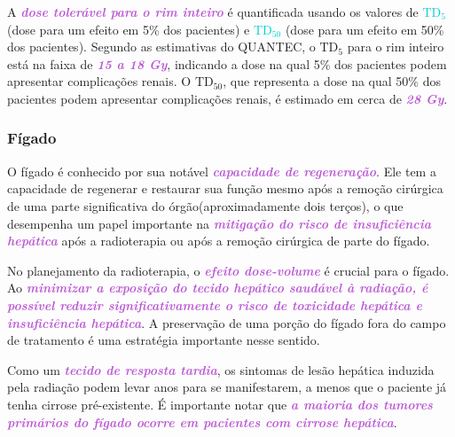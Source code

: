 \documentclass[11pt,a4paper]{article}
\begin{document}
	A \textcolor{MediumOrchid}{\textbf{\textit{dose tolerável para o rim inteiro}}} é quantificada usando os valores de \textcolor{DarkTurquoise}{\textbf{\textit{$\text{TD}_5$}}} (dose para um efeito em 5\% dos pacientes) e \textcolor{DarkTurquoise}{\textbf{\textit{$\text{TD}_50$}}} (dose para um efeito em 50\% dos pacientes). Segundo as estimativas do QUANTEC, o $\text{TD}_5$ para o rim inteiro está na faixa de \textcolor{MediumOrchid}{\textbf{\textit{15 a 18 Gy}}}, indicando a dose na qual 5\% dos pacientes podem apresentar complicações renais. O $\text{TD}_50$, que representa a dose na qual 50\% dos pacientes podem apresentar complicações renais, é estimado em cerca de \textcolor{MediumOrchid}{\textbf{\textit{28 Gy}}}.

\subsubsection*{Fígado}

	O fígado é conhecido por sua notável \textcolor{MediumOrchid}{\textbf{\textit{capacidade de regeneração}}}. Ele tem a capacidade de regenerar e restaurar sua função mesmo após a remoção cirúrgica de uma parte significativa do órgão(aproximadamente dois terços), o que desempenha um papel importante na \textcolor{MediumOrchid}{\textbf{\textit{mitigação do risco de insuficiência hepática}}} após a radioterapia ou após a remoção cirúrgica de parte do fígado.

	No planejamento da radioterapia, o \textcolor{MediumOrchid}{\textbf{\textit{efeito dose-volume}}} é crucial para o fígado. Ao \textcolor{MediumOrchid}{\textbf{\textit{minimizar a exposição do tecido hepático saudável à radiação, é possível reduzir significativamente o risco de toxicidade hepática e insuficiência hepática}}}. A preservação de uma porção do fígado fora do campo de tratamento é uma estratégia importante nesse sentido.

	Como um \textcolor{MediumOrchid}{\textbf{\textit{tecido de resposta tardia}}}, os sintomas de lesão hepática induzida pela radiação podem levar anos para se manifestarem, a menos que o paciente já tenha cirrose pré-existente. É importante notar que \textcolor{MediumOrchid}{\textbf{\textit{a maioria dos tumores primários do fígado ocorre em pacientes com cirrose hepática}}}.
\end{document}
